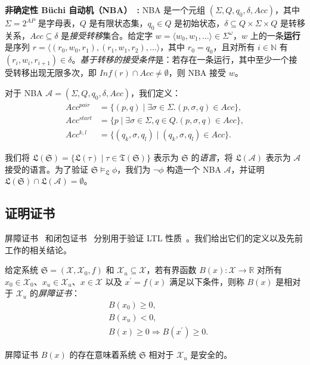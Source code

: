 \textbf{非确定性 Büchi 自动机（NBA）~\cite{hahn2020reward}:} NBA 是一个元组 $(\Sigma, Q, q_0, \delta, Acc)$，其中 $\Sigma = 2^{AP}$ 是字母表，$Q$ 是有限状态集，$q_0 \in Q$ 是初始状态，$\delta \subseteq Q \times \Sigma \times Q$ 是转移关系，$Acc \subseteq \delta$ 是\emph{接受转移}集合。给定字 $w = \langle w_0, w_1, \ldots \rangle \in \Sigma^{\omega}$，$w$ 上的一条\textbf{运行}是序列 $r = \langle (r_0, w_0, r_1), (r_1, w_1, r_2), \ldots \rangle$，其中 $r_0 = q_0$，且对所有 $i \in \mathbb{N}$ 有 $(r_i, w_i, r_{i+1}) \in \delta$。\textit{基于转移的接受条件}是：若存在一条运行，其中至少一个接受转移出现无限多次，即 $\mathit{Inf}(r) \cap Acc \neq \emptyset$，则 NBA 接受 $w$。

对于 NBA $\mathcal{A} = (\Sigma, Q, q_0, \delta, Acc)$，我们定义：
\begin{align}
  Acc^{pair} &= \{(p, q) \mid \exists \sigma \in \Sigma. (p, \sigma, q) \in Acc \}, \label{atpair}\\
  Acc^{start} &= \{p \mid \exists \sigma \in \Sigma, q \in Q. (p, \sigma, q) \in Acc \}, \label{atstart}\\
  Acc^{k, l} &= \{(q_k, \sigma, q_l) \mid (q_k, \sigma, q_l) \in Acc \}. \label{atkl}
\end{align}

我们将 $\mathfrak{L}(\mathfrak{S}) = \{\mathfrak{L}(\tau) \mid \tau \in \mathfrak{T}(\mathfrak{S})\}$ 表示为 $\mathfrak{S}$ 的\emph{语言}，将 $\mathfrak{L}(\mathcal{A})$ 表示为 $\mathcal{A}$ 接受的语言。为了验证 $\mathfrak{S} \models_{\mathfrak{L}} \phi$，我们为 $\neg \phi$ 构造一个 NBA $\mathcal{A}$，并证明 $\mathfrak{L}(\mathfrak{S}) \cap \mathfrak{L}(\mathcal{A}) = \emptyset$。

\subsection{证明证书}
屏障证书~\cite{prajna2004safety} 和闭包证书~\cite{murali2024closure} 分别用于验证 LTL 性质~\cite{wongpiromsarn2015automata,murali2024closure}。我们给出它们的定义以及先前工作的相关结论。

\begin{definition}
  \label{SCDEF}
  给定系统 $\mathfrak{S} = (\mathcal{X}, \mathcal{X}_0, f)$ 和 $\mathcal{X}_{u} \subseteq \mathcal{X}$，若有界函数 $B(x): \mathcal{X} \rightarrow \mathbb{R}$ 对所有 $x_0 \in \mathcal{X}_0$、$x_u \in \mathcal{X}_u$、$x \in \mathcal{X}$ 以及 $x^{\prime} = f(x)$ 满足以下条件，则称 $B(x)$ 是相对于 $\mathcal{X}_{u}$ 的\emph{屏障证书}：
  \begin{align}
    &B(x_0) \geq 0, \label{bsinn0} \\ %
    &B(x_u) < 0, \label{bsun0} \\ %
    &B(x) \geq 0 \Rightarrow B(x^{\prime}) \geq 0. \label{bstnn0} %
  \end{align}
\end{definition}
\begin{theorem}
  \label{corollary_tbsc}
  屏障证书 \( B(x) \) 的存在意味着系统 $\mathfrak{S}$ 相对于 $\mathcal{X}_u$ 是安全的。
\end{theorem}

